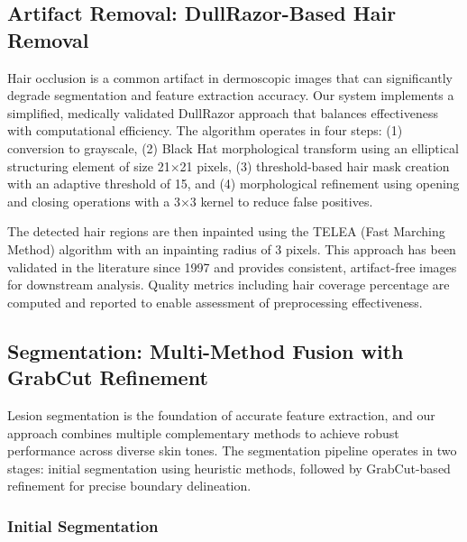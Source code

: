 \documentclass[conference]{IEEEtran}
\begin{document}
\subsection{Artifact Removal: DullRazor-Based Hair Removal}

Hair occlusion is a common artifact in dermoscopic images that can significantly degrade segmentation and feature extraction accuracy. Our system implements a simplified, medically validated DullRazor approach that balances effectiveness with computational efficiency. The algorithm operates in four steps: (1) conversion to grayscale, (2) Black Hat morphological transform using an elliptical structuring element of size 21×21 pixels, (3) threshold-based hair mask creation with an adaptive threshold of 15, and (4) morphological refinement using opening and closing operations with a 3×3 kernel to reduce false positives.

The detected hair regions are then inpainted using the TELEA (Fast Marching Method) algorithm with an inpainting radius of 3 pixels. This approach has been validated in the literature since 1997 and provides consistent, artifact-free images for downstream analysis. Quality metrics including hair coverage percentage are computed and reported to enable assessment of preprocessing effectiveness.


\subsection{Segmentation: Multi-Method Fusion with GrabCut Refinement}

Lesion segmentation is the foundation of accurate feature extraction, and our approach combines multiple complementary methods to achieve robust performance across diverse skin tones. The segmentation pipeline operates in two stages: initial segmentation using heuristic methods, followed by GrabCut-based refinement for precise boundary delineation.

\subsubsection{Initial Segmentation}
\end{document}
